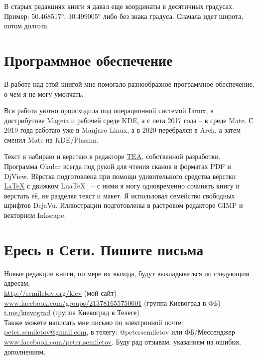 В старых редакциях книги я давал еще координаты в десятичных градусах. Пример: 50.468517°, 30.499005° либо без знака градуса. Сначала идет широта, потом долгота. 

\section*{Программное обеспечение} 

В работе над этой книгой мне помогало разнообразное программное обеспечение, о чем я не могу умолчать.

Вся работа уютно происходила под операционной системой Linux, в дистрибутиве Mageia и рабочей среде KDE, а с лета 2017 года – в среде Mate. С 2019 года работаю уже в Manjaro Linux, а в 2020 перебрался в Arch, а затем сменил Mate на KDE/Plasma. 

Текст я набираю и верстаю в редакторе \href{http://semiletov.org/tea}{TEA}, собственной разработки. Программа Okular всегда под рукой для чтения сканов в форматах PDF и DjView. Вёрстка подготовлена при помощи удивительного средства вёрстки \href{http://www.latex-project.org/}{\LaTeX} с движком Lua\TeX~ – с ними я могу одновременно сочинять книгу и верстать её, не разделяя текст и макет. Я использовал семейство свободных шрифтов DejaVu. Иллюстрации подготовлены в растровом редакторе GIMP и векторном Inkscape.




\section*{Ересь в Сети. Пишите письма}

Новые редакции книги, по мере их выхода, будут выкладываться по следующим адресам:\\ 

\noindent
\href{http://semiletov.org/kiev}{http://semiletov.org/kiev} (мой сайт)\\
\href{https://www.facebook.com/groups/213781655750601/}{www.facebook.com/groups/213781655750601} (группа Киевоград в ФБ)\\
\href{https://t.me/kievograd}{t.me/kievograd} (группа Киевоград в Телеге)\\

Также можете написать мне письмо по электронной почте: \href{peter.semiletov@gmail.com}{peter.semiletov@gmail.com}, 
в телегу: @petersemiletov или ФБ/Мессенджер \href{https://www.facebook.com/peter.semiletov}{www.facebook.com/peter.semiletov}. Буду рад отзывам, указаниям на ошибки, дополнениям.
